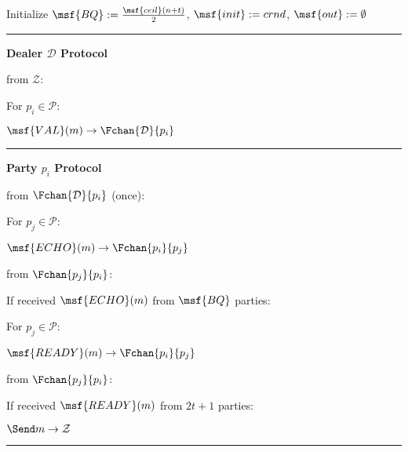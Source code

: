 \begin{bbox}[title={$\Pi_{\msf{Bracha}} (\mathcal{D}, \mathcal{P} = p_1,...,p_n)$ in $\F_{\msf{sync-chan}}$-hybrid}]

Initialize $\msf{BQ} := \frac{\msf{ceil}(n+t)}{2}$, $\msf{init} := crnd$, $\msf{out} := \emptyset$

\vspace{2mm} \hrule \vspace{2mm}

{\bf Dealer $\mathcal{D}$ Protocol}

\OnInput {} from $\mathcal{Z}$:
	\begin{renumerate}
	\item For $p_i \in \mathcal{P}$:

		\quad  \Send $\msf{VAL}(m) \rightarrow \Fchan{\mathcal{D}}{p_i}$
	\end{renumerate}

\vspace{2mm} \hrule \vspace{2mm}

{\bf Party $p_i$ Protocol}

\OnInput {} from $\Fchan{\mathcal{D}}{p_i}$ (once):
	\begin{renumerate}
	\item For $p_j \in \mathcal{P}$: 
	
	\quad \Send $\msf{ECHO}(m) \rightarrow \Fchan{p_i}{p_j}$\\
	\end{renumerate}


\OnInput {} from $\Fchan{p_j}{p_i}$:
	\begin{renumerate}
	\item If received $\msf{ECHO}(m)$ from $\msf{BQ}$ parties:
		\begin{ritemize}
		\item For $p_j \in \mathcal{P}$: 
		
		\quad \Send $\msf{READY}(m) \rightarrow \Fchan{p_i}{p_j}$ \\
		\end{ritemize}
	\end{renumerate}

\OnInput {} from $\Fchan{p_j}{p_i}$:
	\begin{renumerate}
	\item If received $\msf{READY}(m)$ from $2t+1$ parties:
		\begin{ritemize}
		\item $\Send m \rightarrow \mathcal{Z}$
		\end{ritemize}
	\end{renumerate}

\vspace{2mm} \hrule \vspace{2mm}

\end{bbox}

